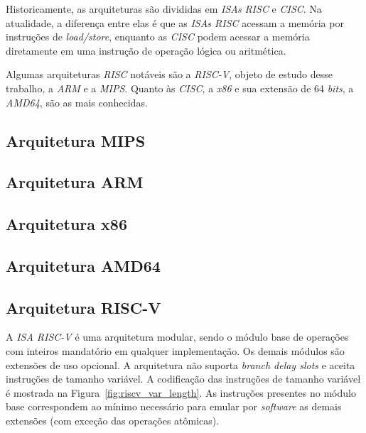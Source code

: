 { Historicamente, as arquiteturas são divididas em \textit{ISAs}
    \textit{RISC} e \textit{CISC}. Na atualidade, a diferença entre elas é que
    as \textit{ISAs RISC} acessam a memória por instruções de
    \textit{load/store}, enquanto as \textit{CISC} podem acessar a memória
    diretamente em uma instrução de operação lógica ou aritmética.
}

{ Algumas arquiteturas \textit{RISC} notáveis são a \textit{RISC-V}, objeto de
    estudo desse trabalho, a \textit{ARM} e a \textit{MIPS}. Quanto às
    \textit{CISC}, a \textit{x86} e sua extensão de 64 \textit{bits}, a
    \textit{AMD64}, são as mais conhecidas.
}

    \subsection{Arquitetura MIPS}
    {}

    \subsection{Arquitetura ARM}
    {}

    \subsection{Arquitetura x86}
    {}

    \subsection{Arquitetura AMD64}
    {}

    \subsection{Arquitetura RISC-V}
    { A \textit{ISA RISC-V} é uma arquitetura modular, sendo o módulo base de
        operações com inteiros mandatório em qualquer implementação. Os demais
        módulos são extensões de uso opcional. A arquitetura não suporta
        \textit{branch delay slots} e aceita instruções de tamanho variável. A
        codificação das instruções de tamanho variável é mostrada na
        Figura~\ref{fig:riscv_var_length}. As instruções presentes no módulo
        base correspondem ao mínimo necessário para emular por
        \textit{software} as demais extensões (com exceção das operações
        atômicas).
    }

